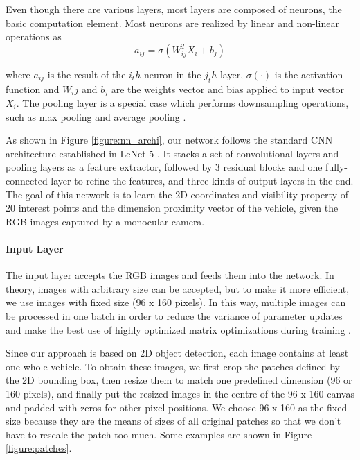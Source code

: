 \documentclass[a4paper,12pt]{article}
\begin{document}
Even though there are various layers, most layers  are composed of neurons, the basic computation element. Most neurons are realized by linear and non-linear operations as 
\begin{equation}
a_{ij} = \sigma(W_{ij}^T X_i +b_j)
\end{equation}

where $a_{ij}$ is the result of the $i_th$ neuron in the $j_th$ layer, $\sigma(\cdot)$ is the activation function and $W_ij$ and $b_j$ are the weights vector and bias applied to input vector $X_i$.  The pooling layer is a special case which performs downsampling operations, such as max pooling \cite{Boureau:2010} and average pooling \cite{6460871}.

As shown in Figure \ref{figure:nn_archi}, our network follows the standard CNN architecture established in LeNet-5 \cite{726791}. It stacks a set of convolutional layers and pooling layers as a feature extractor, followed by 3 residual blocks and one fully-connected layer to refine the features, and three kinds of output layers in the end. The goal of this network is to learn the 2D coordinates and visibility property of 20 interest points and the dimension proximity vector of the vehicle, given the RGB images captured by a monocular camera.

\paragraph{Input Layer}
The input layer accepts the RGB images and feeds them into the network. In theory, images with arbitrary size can be accepted, but to make it more efficient, we use images with fixed size (96 x 160 pixels).  In this way, multiple images can be processed in one batch in order to reduce the variance of parameter updates and make the best use of highly optimized matrix optimizations during training \cite{DBLP:journals/corr/Ruder16}.

Since our approach is based on 2D object detection, each image contains at least one whole vehicle. To obtain these images, we first crop the patches defined by the 2D bounding box, then resize them to match one predefined dimension (96 or 160 pixels), and finally put the resized images in the centre of the 96 x 160 canvas and padded with zeros for other pixel positions. We choose 96 x 160 as the fixed size because they are the means of sizes of all original patches so that we don't have to rescale the patch too much.  Some examples are shown in Figure \ref{figure:patches}.
\end{document}
